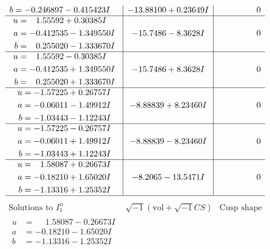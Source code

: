 \documentclass[1p]{elsarticle_modified}
\theoremstyle{definition}
\newcommand{\I}{\sqrt{-1}}
\begin{document}
$$\begin{array}{c|c|c}
\begin{aligned}
b &= -0.246897 - 0.415423 I\end{aligned}
 & -13.88100 + 0.23649 I & \phantom{-0.000000 } 0 \\ \hline\begin{aligned}
u &= \phantom{-}1.55592 + 0.30385 I \\
a &= -0.412535 - 1.349550 I \\
b &= \phantom{-}0.255020 - 1.333670 I\end{aligned}
 & -15.7486 - 8.3628 I & \phantom{-0.000000 } 0 \\ \hline\begin{aligned}
u &= \phantom{-}1.55592 - 0.30385 I \\
a &= -0.412535 + 1.349550 I \\
b &= \phantom{-}0.255020 + 1.333670 I\end{aligned}
 & -15.7486 + 8.3628 I & \phantom{-0.000000 } 0 \\ \hline\begin{aligned}
u &= -1.57225 + 0.26757 I \\
a &= -0.06011 - 1.49912 I \\
b &= -1.03443 - 1.12243 I\end{aligned}
 & -8.88839 + 8.23460 I & \phantom{-0.000000 } 0 \\ \hline\begin{aligned}
u &= -1.57225 - 0.26757 I \\
a &= -0.06011 + 1.49912 I \\
b &= -1.03443 + 1.12243 I\end{aligned}
 & -8.88839 - 8.23460 I & \phantom{-0.000000 } 0 \\ \hline\begin{aligned}
u &= \phantom{-}1.58087 + 0.26673 I \\
a &= -0.18210 + 1.65020 I \\
b &= -1.13316 + 1.25352 I\end{aligned}
 & -8.2065 - 13.5471 I & \phantom{-0.000000 } 0\\
 \hline 
 \end{array}$$\newpage$$\begin{array}{c|c|c}  
\text{Solutions to }I^u_{1}& \I (\text{vol} + \sqrt{-1}CS) & \text{Cusp shape}\\
 \hline 
\begin{aligned}
u &= \phantom{-}1.58087 - 0.26673 I \\
a &= -0.18210 - 1.65020 I \\
b &= -1.13316 - 1.25352 I\end{aligned}

\end{array}$$
\end{document}
